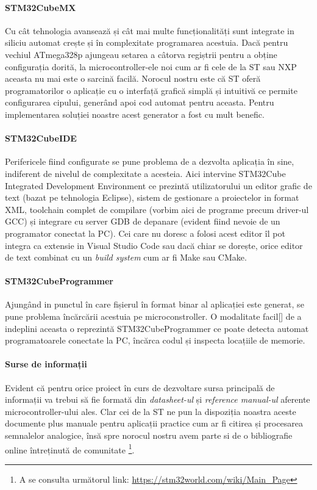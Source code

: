 \paragraph{STM32CubeMX}
Cu cât tehnologia avansează și cât mai multe funcționalități sunt integrate in siliciu automat crește și în complexitate programarea acestuia. Dacă pentru vechiul ATmega328p ajungeau setarea a câtorva regiștrii pentru a obține configurația dorită, la microcontroller-ele noi cum ar fi cele de la ST sau NXP aceasta nu mai este o sarcină facilă. Norocul nostru este că ST oferă programatorilor o aplicație cu o interfață grafică simplă și intuitivă ce permite configurarea cipului, generând apoi cod automat pentru aceasta. Pentru implementarea soluției noastre acest generator a fost cu mult benefic.

\paragraph{STM32CubeIDE}
Perifericele fiind configurate se pune problema de a dezvolta aplicația în sine, indiferent de nivelul de complexitate a acesteia. Aici intervine STM32Cube Integrated Development Environment ce prezintă utilizatorului un editor grafic de text (bazat pe tehnologia Eclipse), sistem de gestionare a proiectelor in format XML, toolchain complet de compilare (vorbim aici de programe precum driver-ul GCC) și integrare cu server GDB de depanare (evident fiind nevoie de un programator conectat la PC). Cei care nu doresc a folosi acest editor îl pot integra ca extensie in  Visual Studio Code sau dacă chiar se dorește, orice editor de text combinat cu un \textit{build system} cum ar fi Make sau CMake.

\paragraph{STM32CubeProgrammer}
Ajungând in punctul în care fișierul în format binar al aplicației este generat, se pune problema încărcării acestuia pe microconstroller. O modalitate facil[] de a indeplini aceasta o reprezintă STM32CubeProgrammer ce poate detecta automat programatoarele conectate la PC, încărca codul și inspecta locațiile de memorie.

\paragraph{Surse de informații}
Evident că pentru orice proiect în curs de dezvoltare sursa principală de informații va trebui să fie formată din \textit{datasheet-ul} și \textit{reference manual-ul} aferente microcontroller-ului ales. Clar cei de la ST ne pun la dispoziția noastra aceste documente plus manuale pentru aplicații practice cum ar fi citirea și procesarea semnalelor analogice, însă spre norocul nostru avem parte si de o bibliografie online întreținută de comunitate \footnote{A se consulta următorul link: \url{https://stm32world.com/wiki/Main_Page}}. 

